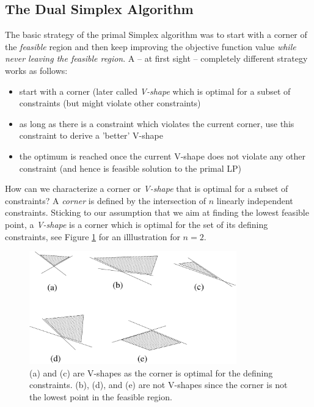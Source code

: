 \documentclass{article}
\begin{document}
\subsection{The Dual Simplex Algorithm}

The basic strategy of the primal Simplex algorithm was to start with a corner of the \emph{feasible} region and then keep improving the objective function value \emph{while never leaving the feasible region}. A -- at first sight -- completely different strategy works as follows:
\begin{itemize}
\item start with a corner (later called \emph{V-shape} which is optimal for a subset of constraints (but might violate other constraints)
\item as long as there is a constraint which violates the current corner, use this constraint to derive a 'better' V-shape
\item the optimum is reached once the current V-shape does not violate any other constraint (and hence is feasible solution to the primal LP)
\end{itemize}

How can we characterize a corner or \emph{V-shape} that is optimal for a subset of constraints? A \emph{corner} is defined by the intersection of $n$ linearly independent constraints. Sticking to our assumption that we aim at finding the lowest feasible point, a \emph{V-shape} is a corner which is optimal for the set of its defining constraints, see Figure \ref{fig:Vshapes} for an illlustration for $n=2$.

\begin{figure}
\begin{center}
\includegraphics[width=0.8\textwidth]{Figs/Vshape.pdf}
\caption{(a) and (c) are V-shapes as the corner is optimal for the defining constraints. (b), (d), and (e) are not V-shapes since the corner is not the lowest point in the feasible region.}\label{fig:Vshapes}
\end{center}
\end{figure}
\end{document}
